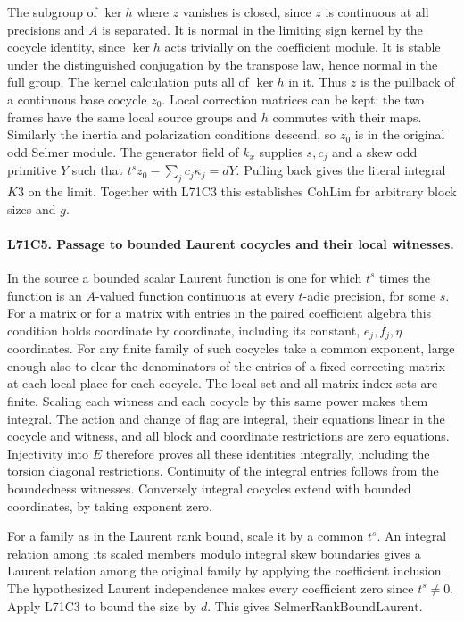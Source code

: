The subgroup of $\ker h$ where $z$ vanishes is closed, since
$z$ is continuous at all precisions and $A$ is separated. It
is normal in the limiting sign kernel by the cocycle identity,
since $\ker h$ acts trivially on the coefficient module.
It is stable under the distinguished conjugation by the transpose
law, hence normal in the full group. The kernel calculation
puts all of $\ker h$ in it. Thus $z$ is the pullback of a
continuous base cocycle $z_0$. Local correction matrices can be
kept: the two frames have the same local source groups and
$h$ commutes with their maps. Similarly the inertia and
polarization conditions descend, so $z_0$ is in the original
odd Selmer module. The generator field of $k_x$ supplies $s,c_j$
and a skew odd primitive $Y$ such that
$t^s z_0-\sum_j c_j\kappa_j=dY$. Pulling back gives the
literal integral $K3$ on the limit. Together with L71C3 this
establishes $\mathrm{CohLim}$ for arbitrary block sizes and $g$.

\paragraph{L71C5. Passage to bounded Laurent cocycles and their local witnesses.}
In the source a bounded scalar Laurent function is one for which
$t^s$ times the function is an $A$-valued function continuous at
every $t$-adic precision, for some $s$. For a matrix or for a
matrix with entries in the paired coefficient algebra this
condition holds coordinate by coordinate, including its constant,
$e_j,f_j,\eta$ coordinates. For any finite family of such
cocycles take a common exponent, large enough also to clear the
denominators of the entries of a fixed correcting matrix at
each local place for each cocycle. The local set and all matrix
index sets are finite. Scaling each witness and each cocycle by
this same power makes them integral. The action and change of
flag are integral, their equations linear in the cocycle and
witness, and all block and coordinate restrictions are zero
equations. Injectivity into $E$ therefore proves all these
identities integrally, including the torsion diagonal restrictions.
Continuity of the integral entries follows from the boundedness
witnesses. Conversely integral cocycles extend with bounded
coordinates, by taking exponent zero.

For a family as in the Laurent rank bound, scale it by a common
$t^s$. An integral relation among its scaled members modulo
integral skew boundaries gives a Laurent relation among the
original family by applying the coefficient inclusion. The
hypothesized Laurent independence makes every coefficient zero
since $t^s\ne0$. Apply L71C3 to bound the size by $d$.
This gives $\mathrm{SelmerRankBoundLaurent}$.

